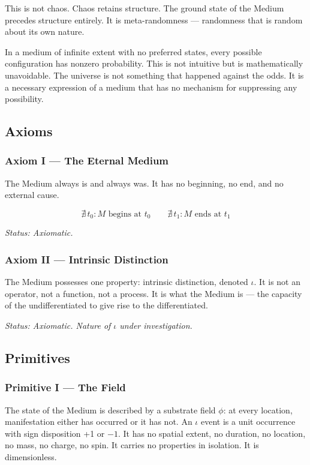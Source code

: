 \documentclass[11pt,letterpaper]{article}
\begin{document}
This is not chaos. Chaos retains structure. The ground state of the Medium precedes structure entirely. It is meta-randomness --- randomness that is random about its own nature.

In a medium of infinite extent with no preferred states, every possible configuration has nonzero probability. This is not intuitive but is mathematically unavoidable. The universe is not something that happened against the odds. It is a necessary expression of a medium that has no mechanism for suppressing any possibility.
\subsection{Axioms}
\label{sec:org5ba3f04}

\subsubsection{Axiom I --- The Eternal Medium}
\label{sec:orgf8c84e0}

The Medium always is and always was. It has no beginning, no end, and no external cause.

\begin{equation}
\nexists\, t_0 : M \text{ begins at } t_0 \qquad \nexists\, t_1 : M \text{ ends at } t_1
\end{equation}

\emph{Status: Axiomatic.}
\subsubsection{Axiom II --- Intrinsic Distinction}
\label{sec:orgf94a47f}

The Medium possesses one property: intrinsic distinction, denoted \(\iota\). It is not an operator, not a function, not a process. It is what the Medium is --- the capacity of the undifferentiated to give rise to the differentiated.

\emph{Status: Axiomatic. Nature of \(\iota\) under investigation.}
\subsection{Primitives}
\label{sec:orgb715ece}

\subsubsection{Primitive I --- The Field}
\label{sec:org2309efd}

The state of the Medium is described by a substrate field \(\phi\): at every location, manifestation either has occurred or it has not. An \(\iota\) event is a unit occurrence with sign disposition +1 or \(-1\). It has no spatial extent, no duration, no location, no mass, no charge, no spin. It carries no properties in isolation. It is dimensionless.
\end{document}
